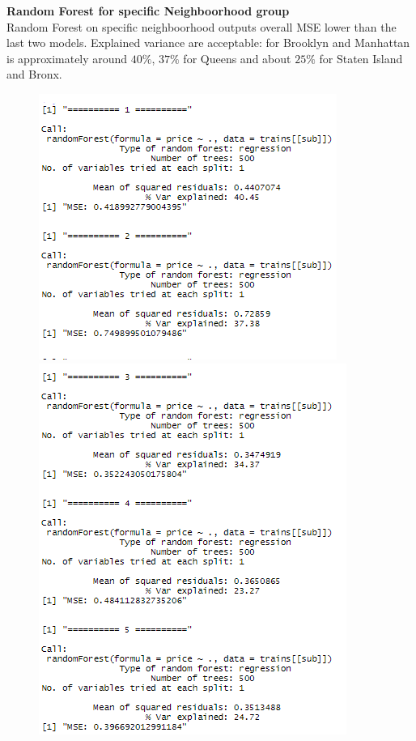 \documentclass{FR16}
\begin{document}
\noindent \textbf{Random Forest for specific Neighboorhood group}\\
Random Forest on specific neighboorhood outputs overall MSE lower than the last two models. Explained variance are acceptable: for Brooklyn and Manhattan is approximately around $40\%$, $37\%$ for Queens and about $25\%$ for Staten Island and Bronx. 
\begin{figure}[!htb]
   \begin{minipage}{0.48\textwidth}
     \centering
     \includegraphics[width=1\linewidth]{figures/rf1.1.png} 
   \end{minipage}\hfill
   \begin{minipage}{0.48\textwidth}
     \centering
     \includegraphics[width=1\linewidth]{figures/rf1.2.png}

\end{minipage}
\end{figure}
\end{document}
